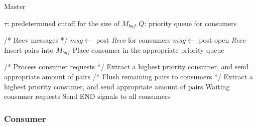 \documentclass[10pt,journal,letterpaper,compsoc]{IEEEtran}
\begin{document}
\begin{algorithm}
\caption{Master}
\label{ms}
\begin{algorithmic}[1]

    \STATE $\tau$: predetermined cutoff for the size of $M_{buf}$
    \STATE $Q$: priority queue for consumers

    \WHILE{\TRUE}
        \STATE /* Recv messages */
            \STATE $msg\leftarrow$ post {\it Recv} for consumers
        \ELSE 
            \STATE $msg\leftarrow$ post open {\it Recv}
                \STATE Insert pairs into $M_{buf}$
                \ENDIF
                \STATE Place consumer in the appropriate priority queue
            \ENDIF
        \ENDIF
        
        \STATE /* Process consumer requests */
            \STATE Extract a highest priority consumer, and send appropriate amount of pairs
        \ENDWHILE
    \ENDWHILE
    \STATE /* Flush remaining pairs to consumers */
                \STATE Extract a highest priority consumer, and send appropriate amount of pairs
            \ELSE
                \STATE Waiting consumer requests
            \ENDIF
    \ENDWHILE
    \STATE Send END signals to all consumers
\end{algorithmic}
\end{algorithm}



\subsubsection{Consumer}
\label{secConsumer}
\end{document}
